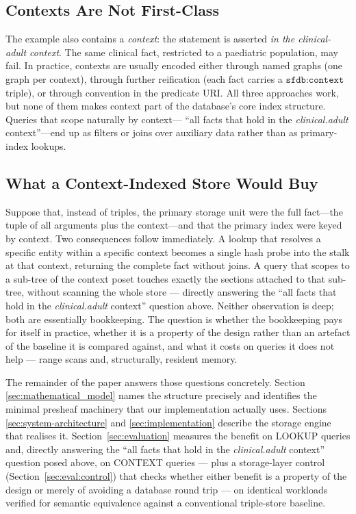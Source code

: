 \subsection{Contexts Are Not First-Class}
\label{sec:motivation:contexts}

The example also contains a \emph{context}: the statement is asserted \emph{in
the clinical-adult context}. The same clinical fact, restricted to a
paediatric population, may fail. In practice, contexts are usually encoded
either through named graphs (one graph per context), through further
reification (each fact carries a $\texttt{sfdb:context}$ triple), or through
convention in the predicate URI. All three approaches work, but none of them
makes context part of the database's core index structure. Queries that scope
naturally by context--- ``all facts that hold in the \emph{clinical.adult}
context''---end up as filters or joins over auxiliary data rather than as
primary-index lookups.

\subsection{What a Context-Indexed Store Would Buy}
\label{sec:motivation:sheaf}

Suppose that, instead of triples, the primary storage unit were the full
fact---the tuple of all arguments plus the context---and that the primary
index were keyed by context. Two consequences follow immediately. A lookup
that resolves a specific entity within a specific context becomes a single
hash probe into the stalk at that context, returning the complete fact
without joins. A query that scopes to a sub-tree of the context poset touches
exactly the sections attached to that sub-tree, without scanning the whole
store --- directly answering the ``all facts that hold in the
\emph{clinical.adult} context'' question above. Neither observation is deep; both are essentially bookkeeping. The
question is whether the bookkeeping pays for itself in practice, whether it
is a property of the design rather than an artefact of the baseline it is
compared against, and what it costs on queries it does not help --- range
scans and, structurally, resident memory.

The remainder of the paper answers those questions concretely. Section
\ref{sec:mathematical_model} names the structure precisely and identifies the
minimal presheaf machinery that our implementation actually uses. Sections
\ref{sec:system-architecture} and \ref{sec:implementation} describe the
storage engine that realises it. Section~\ref{sec:evaluation} measures the
benefit on LOOKUP queries and, directly answering the ``all facts that hold
in the \emph{clinical.adult} context'' question posed above, on CONTEXT
queries --- plus a storage-layer control (Section~\ref{sec:eval:control})
that checks whether either benefit is a property of the design or merely of
avoiding a database round trip --- on identical
workloads verified for semantic equivalence against a conventional
triple-store baseline.

